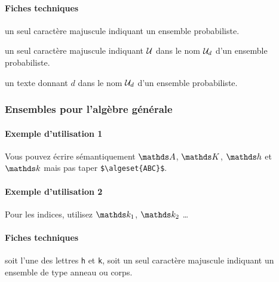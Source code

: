\documentclass[12pt,a4paper]{article}
\begin{document}
            \paragraph{Fiches techniques}


\IDarg{} un seul caractère \ascii{} majuscule indiquant un ensemble probabiliste.


\bigskip



 un seul caractère \ascii{} majuscule indiquant $\probaset{U}$ dans le nom $\probaset*{U}{d}$ d'un ensemble probabiliste.

 un texte donnant $d$ dans le nom $\probaset*{U}{d}$ d'un ensemble probabiliste.



        \subsubsection{Ensembles pour l'algèbre générale}

            \paragraph{Exemple d'utilisation 1}

\begin{tcblisting}{}
Vous pouvez écrire sémantiquement $\algeset{A}$, $\algeset{K}$, $\algeset{h}$ et
$\algeset{k}$ mais pas taper \verb+$\algeset{ABC}$+.
\end{tcblisting}


            \paragraph{Exemple d'utilisation 2}

\begin{tcblisting}{}
Pour les indices, utilisez $\algeset*{k}{1}$, $\algeset*{k}{2}$ \dots
\end{tcblisting}


            \paragraph{Fiches techniques}


\IDarg{} soit l'une des lettres  \texttt{h} et \texttt{k}, soit un seul caractère \ascii{} majuscule indiquant un ensemble de type anneau ou corps.
\end{document}
